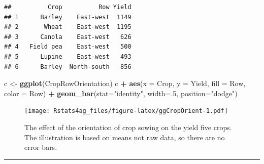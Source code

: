 \documentclass[letterpaper,]{book}
\newenvironment{Shaded}{\begin{snugshade}}{\end{snugshade}}
\newcommand{\DataTypeTok}[1]{\textcolor[rgb]{0.13,0.29,0.53}{#1}}
\newcommand{\DecValTok}[1]{\textcolor[rgb]{0.00,0.00,0.81}{#1}}
\newcommand{\KeywordTok}[1]{\textcolor[rgb]{0.13,0.29,0.53}{\textbf{#1}}}
\newcommand{\NormalTok}[1]{#1}
\newcommand{\OperatorTok}[1]{\textcolor[rgb]{0.81,0.36,0.00}{\textbf{#1}}}
\newcommand{\StringTok}[1]{\textcolor[rgb]{0.31,0.60,0.02}{#1}}
\begin{document}
\begin{verbatim}
##          Crop          Row Yield
## 1      Barley    East-west  1149
## 2       Wheat    East-west  1195
## 3      Canola    East-west   626
## 4   Field pea    East-west   500
## 5      Lupine    East-west   493
## 6      Barley  North-south   856
\end{verbatim}

\begin{Shaded}
\begin{Highlighting}[]
\NormalTok{c <-}\StringTok{ }\KeywordTok{ggplot}\NormalTok{(CropRowOrientation)}
\NormalTok{c }\OperatorTok{+}\StringTok{ }\KeywordTok{aes}\NormalTok{(}\DataTypeTok{x =}\NormalTok{ Crop, }\DataTypeTok{y =}\NormalTok{ Yield, }\DataTypeTok{fill =}\NormalTok{ Row, }\DataTypeTok{color =}\NormalTok{ Row) }\OperatorTok{+}
\StringTok{      }\KeywordTok{geom_bar}\NormalTok{(}\DataTypeTok{stat=}\StringTok{"identity"}\NormalTok{, }\DataTypeTok{width=}\NormalTok{.}\DecValTok{5}\NormalTok{, }\DataTypeTok{position=}\StringTok{"dodge"}\NormalTok{)}
\end{Highlighting}
\end{Shaded}

\begin{figure}
\centering
\texttt{[image: Rstats4ag\_files/figure-latex/ggCropOrient-1.pdf]}
\caption{\label{fig:ggCropOrient}The effect of the orientation of crop sowing on the yield five crops. The illustration is based on means not raw data, so there are no error bars.}
\end{figure}

\begin{center}\rule{0.5\linewidth}{0.5pt}\end{center}
\end{document}
